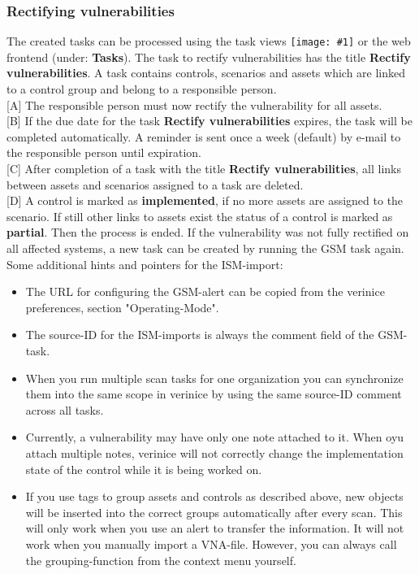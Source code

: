 \documentclass[a4paper,10pt]{book}
\newcommand{\icon}[1]{\texttt{[image: \#1]}}
\begin{document}
\subsubsection{Rectifying vulnerabilities}
The created tasks can be processed using the task views \icon{Icon/Tasks.png} or the web frontend
(under: \textbf{Tasks}). The task to rectify vulnerabilities has the title \textbf{Rectify vulnerabilities}. A task contains controls, scenarios and assets which are linked to a control group and belong to a responsible person.
\newline\\
{[}A{]} The responsible person must now rectify the vulnerability for all assets.
\newline\\
{[}B{]} If the due date for the task \textbf{Rectify vulnerabilities} expires, the task will be completed automatically. A reminder is sent once a week (default) by e-mail to the responsible
person  until expiration.
\newline\\
{[}C{]} After completion of a task with the title  \textbf{Rectify vulnerabilities}, all links between assets and scenarios assigned to a task are deleted.
\newline\\
{[}D{]} A control is marked as \textbf{implemented}, if no more assets are assigned to the scenario. If still other links to assets exist the status of a control is marked as \textbf{partial}. Then the process is ended.
If the vulnerability was not fully rectified on all affected systems, a new task can be created by running the GSM task again.
Some additional hints and pointers for the ISM-import:
\begin{itemize}
    \item The URL for configuring the GSM-alert can be copied from the verinice preferences, section "Operating-Mode".
    \item The source-ID for the ISM-imports is always the comment field of the GSM-task.
    \item When you run multiple scan tasks for one organization you can synchronize them into the same scope in verinice by using the same source-ID comment across all tasks.
    \item Currently, a vulnerability may have only one note attached to it. When oyu attach multiple notes, verinice will not correctly change the implementation state of the control while it is being worked on.
    \item If you use tags to group assets and controls as described above, new objects will be inserted into the correct groups automatically after every scan. This will only work when you use an alert to transfer the information. It will not work when you manually import a VNA-file. However, you can always call the grouping-function from the context menu yourself.
\end{itemize}
\end{document}
